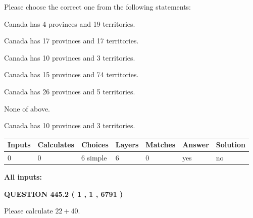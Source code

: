 \documentclass[12pt]{article}
\begin{document}
  
Please choose the correct one from the following statements:
 
 
Canada has   4 provinces and  19 territories.
 
 
Canada has  17 provinces and  17 territories.
 
 
Canada has 10  provinces and 3 territories.
 
 
Canada has  15 provinces and  74 territories.
 
 
Canada has  26 provinces and  5 territories.
 
 
 None of above.
 
 
\noindent{}
 
 
Canada has 10  provinces and 3 territories.
 
 
\noindent{}
 
 
   
   
   
   
\noindent\begin{tabular}{|l|l|l|l|l|l|l|}
 \hline
Inputs & Calculates & Choices & Layers & Matches & Answer & Solution \\ \hline
 0  & 
 0  & 
 6
  simple  
  & 
 6  & 
 0  & 
  yes & 
  no 
  \\ \hline
 \end{tabular}
   
   
   
   
\noindent{}
   
   
   
   
\noindent\vspace{0.1in}\hspace{-0.08in} {\textbf{\Large{All inputs: }}}
   
   
  
\vspace{0.2in}
  
{\textbf{\Large{QUESTION
445.2 
 ( 1 , 1 , 6791 )
}}}
  
  
 
Please calculate $ %
22 +  %
40 $.
 
 
   
\end{document}
